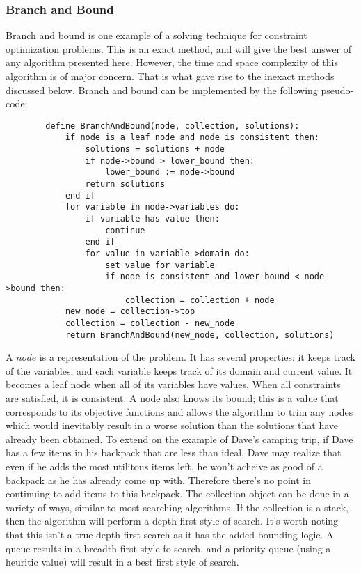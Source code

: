 \documentclass{article}
\begin{document}
    \subsubsection{Branch and Bound}
    Branch and bound is one example of a solving technique for constraint optimization problems. This is an exact method, and will give the 
    best answer of any algorithm presented here. However, the time and space complexity of this algorithm is of major concern. That is what
    gave rise to the inexact methods discussed below. Branch and bound can be implemented by the following pseudo-code:
    \begin{lstlisting}
        define BranchAndBound(node, collection, solutions):
            if node is a leaf node and node is consistent then:
                solutions = solutions + node
                if node->bound > lower_bound then:
                    lower_bound := node->bound
                return solutions
            end if
            for variable in node->variables do:
                if variable has value then:
                    continue
                end if
                for value in variable->domain do:
                    set value for variable
                    if node is consistent and lower_bound < node->bound then:
                        collection = collection + node
            new_node = collection->top
            collection = collection - new_node
            return BranchAndBound(new_node, collection, solutions)
    \end{lstlisting}
    A \(node\) is a representation of the problem. It has several properties: it keeps track of the variables, and each variable keeps track of its 
    domain and current value. It becomes a leaf node when all of its variables have values. When all constraints are satisfied, it is consistent.
    A node also knows its bound; this is a value that corresponds to its objective functions and allows the algorithm to 
    trim any nodes which would inevitably result in a worse solution than the solutions that have already been obtained. To extend on the example 
    of Dave's camping trip, if Dave has a few items in his backpack that are less than ideal, Dave may realize that even if he adds the most 
    utilitous items left, he won't acheive as good of a backpack as he has already come up with. Therefore there's no point in continuing to add 
    items to this backpack. The collection object can be done in a variety of ways, similar to most searching algorithms. If the collection is 
    a stack, then the algorithm will perform a depth first style of search. It's worth noting that this isn't a true depth first search as it has the
    added bounding logic. A queue results in a breadth first style fo search, and a priority queue (using a heuritic value) will result in a
    best first style of search. \cite{LandDoig} \cite{Apt} \cite{Dechter}
\end{document}
